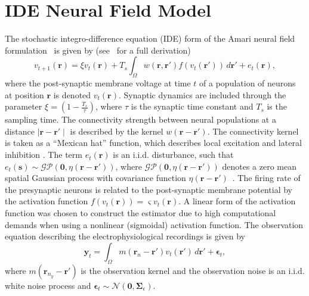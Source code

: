 \documentclass[journal,a4paper]{IEEEtran}
\begin{document}
\section{IDE Neural Field Model}
The stochastic integro-difference equation (IDE) form of the Amari neural field  formulation~\cite{Amari1977} is given by (see~\cite{Freestone2011} for a full derivation)
\begin{equation}\label{eq:DiscreteTimeModel}
	v_{t+1}\left(\mathbf{r}\right) = 
	\xi v_t\left(\mathbf{r}\right) + 
	T_s \int_\Omega { 
	    w\left(\mathbf{r},\mathbf{r'}\right)
	    f\left(v_t\left(\mathbf{r}'\right)\right) 
	\, d\mathbf{r}'} 
	+ e_t\left(\mathbf{r}\right), 
\end{equation}
where the post-synaptic membrane voltage at time $t$ of a population of neurons at position $\mathbf r$ is denoted $v_t\left(\mathbf r\right)$. Synaptic dynamics are included through the parameter $\xi=\left(1-\frac{ T_s}{\tau}\right)$, where $\tau$ is the synaptic time constant and $T_s$ is the sampling time. The connectivity strength between neural populations at a distance $\mid\mathbf{r}-\mathbf{r'}\mid$ is described by the kernel $w\left(\mathbf{r}-\mathbf{r}'\right)$. The connectivity kernel is taken as a ``Mexican hat'' function, which describes local excitation and lateral inhibition \cite{Amari1977}. The term $e_t(\mathbf r)$ is an i.i.d. disturbance, such that $e_t(\mathbf{s})\sim\mathcal{GP}(\mathbf 0,\eta(\mathbf{r}-\mathbf{r'}))$, where $\mathcal{GP}(\mathbf 0,\eta(\mathbf{r}-\mathbf{r'}))$  denotes a zero mean spatial Gaussian process with covariance function $\eta(\mathbf{r}-\mathbf{r'})$~\cite{Rasmussen2005}. The firing rate of the presynaptic neurons is related to the post-synaptic membrane potential by the activation function $f(v_t(\mathbf{r})) = \varsigma v_t(\mathbf{r})$. A linear form of the activation function was chosen to construct the estimator due to high computational demands when using a nonlinear (sigmoidal) activation function. The observation equation describing the electrophysiological recordings is given by 
\begin{equation}\label{eq:ObservationEquation}
	\mathbf y_t = \int_{\Omega} { m\left(\mathbf{r}_{n}-\mathbf{r}'\right) v_t\left(\mathbf{r}'\right) \, d\mathbf{r}'} + \boldsymbol\epsilon_t, 
\end{equation}
where $m\left(\mathbf{r}_{n_y}-\mathbf{r}'\right)$ is the observation kernel and the observation noise is an i.i.d. white noise process and $\boldsymbol{\epsilon}_{t}\sim \mathcal{N}\left(\mathbf{0},\mathbf{\Sigma}_{\epsilon}\right)$. %
\end{document}

